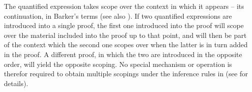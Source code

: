\documentclass[output=paper,colorlinks,citecolor=brown]{langscibook}
\begin{document}
\begin{exe}
 \ex\label{someoneProof}
\end{exe}
The quantified expression takes scope over the context in which it
appears -- its continuation, in Barker's terms \citeyearpar{Barker2002,Barker2004} (see also \citealt{barkershan2015}). If two quantified expressions are
introduced into a single proof, the first one introduced into the
proof will scope over the material included into the proof up to that
point, and will then be part of the context which the second one
scopes over when the latter is in turn added in the proof. A different
proof, in which the two are introduced in the opposite order, will
yield the opposite scoping. No special mechanism or operation is
therefor required to obtain multiple scopings under the inference
rules in  (see \citealt[Section~2.3]{kubotalevineBook} for
details).
\end{document}
